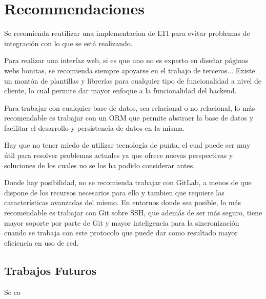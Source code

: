 
\chapter{Recommendaciones}
\label{capitulo8}

Se recomienda reutilizar una implementacion de LTI para evitar problemas de integración con lo que se está realizando.

Para realizar una interfaz web, si es que uno no es experto en diseñar páginas webs bonitas, se recomienda siempre apoyarse en el trabajo de terceros... Existe un montón de plantillas y librerías para cualquier tipo de funcionalidad a nivel de cliente, lo cual permite dar mayor enfoque a la funcionalidad del backend.

Para trabajar con cualquier base de datos, sea relacional o no relacional, lo más recomendable es trabajar con un ORM que permite abstraer la base de datos y facilitar el desarrollo y persistencia de datos en la misma.

Hay que no tener miedo de utilizar tecnología de punta, el cual puede ser muy útil para resolver problemas actuales ya que ofrece nuevas perspectivas y soluciones de los cuales no se los ha podido considerar antes.

Donde hay posibilidad, no se recomienda trabajar con GitLab, a menos de que dispone de los recursos necesarios para ello y tambien que requiere las características avanzadas del mismo. En entornos donde sea posible, lo más recomendable es trabajar con Git sobre SSH, que además de ser más seguro, tiene mayor soporte por parte de Git y mayor inteligencia para la sincronización cuando se trabaja con este protocolo que puede dar como resultado mayor eficiencia en uso de red.


\section{Trabajos Futuros}
Se co
